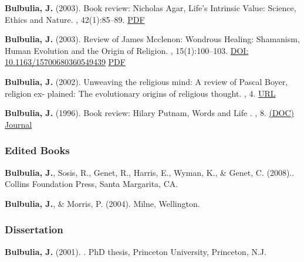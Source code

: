 \documentclass{article}
\begin{document}
\begin{thebibliography}{99}
{\bf Bulbulia, J.} (2003).
\newblock Book review: Nicholas Agar, Life's Intrinsic Value: Science, Ethics and Nature.
, 42(1):85--89. \href{http://db.tt/o8XLYrL}{PDF}


{\bf Bulbulia, J.} (2003).
\newblock Review of {J}ames {M}cclenon: {W}ondrous Healing: Shamanism, Human
  Evolution and the Origin of Religion.
, 15(1):100--103. 
\href{https://doi.org/10.1163/15700680360549439}{DOI: 10.1163/15700680360549439} \href{http://db.tt/AO5Ut4S}{PDF}



{\bf Bulbulia, J.} (2002).
\newblock Unweaving the religious mind: A review of Pascal Boyer, religion ex-
  plained: The evolutionary origins of religious thought.
, 4. \href{http://www.arts.monash.edu.au/publications/eras/edition-4/bulbulia.php}{URL}


{\bf Bulbulia, J.} (1996).
\newblock Book review: {H}ilary {P}utnam, {W}ords and {L}ife .
, 8. \href{http://db.tt/vygRUWn}{(DOC)} \href{http://www.ptsem.edu/koinonia/}{Journal}



\subsubsection*{Edited Books} 



{\bf Bulbulia, J.}, Sosis, R., Genet, R., Harris, E., Wyman, K., \& Genet, C.
  (2008)..
\newblock Collins Foundation Press, Santa Margarita, CA. %


{\bf Bulbulia, J.}, \& Morris, P. (2004).
\newblock Milne, Wellington.


\subsubsection*{Dissertation} 
{\bf Bulbulia, J.} (2001).
.
\newblock PhD thesis, Princeton University, Princeton, N.J.  %


\end{thebibliography}
\end{document}
